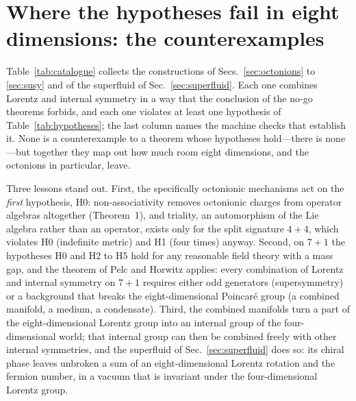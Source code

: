 \section{Where the hypotheses fail in eight dimensions: the counterexamples}
\label{sec:catalogue}

Table~\ref{tab:catalogue} collects the constructions of Secs.~\ref{sec:octonions} to \ref{sec:susy}
and of the superfluid of Sec.~\ref{sec:superfluid}. Each one combines Lorentz and internal symmetry
in a way that the conclusion of the no-go theorems forbids, and each one violates at least one
hypothesis of Table~\ref{tab:hypotheses}; the last column names the machine checks that establish it.
None is a counterexample to a theorem whose hypotheses hold---there is none---but together they map
out how much room eight dimensions, and the octonions in particular, leave.

Three lessons stand out. First, the specifically octonionic mechanisms act on the \emph{first}
hypothesis, H0: non-associativity removes octonionic charges from operator algebras altogether
(Theorem~1), and triality, an automorphism of the Lie algebra rather than an operator, exists only
for the split signature $4+4$, which violates H0 (indefinite metric) and H1 (four times) anyway.
Second, on $7+1$ the hypotheses H0 and H2 to H5 hold for any reasonable field theory with a mass gap,
and the theorem of Pelc and Horwitz applies: every combination of Lorentz and internal symmetry on
$7+1$ requires either odd generators (supersymmetry) or a background that breaks the eight-dimensional
Poincar\'e group (a combined manifold, a medium, a condensate). Third, the combined manifolds turn a
part of the eight-dimensional Lorentz group into an internal group of the four-dimensional world; that
internal group can then be combined freely with other internal symmetries, and the superfluid of
Sec.~\ref{sec:superfluid} does so: its chiral phase leaves unbroken a sum of an eight-dimensional
Lorentz rotation and the fermion number, in a vacuum that is invariant under the four-dimensional
Lorentz group.

